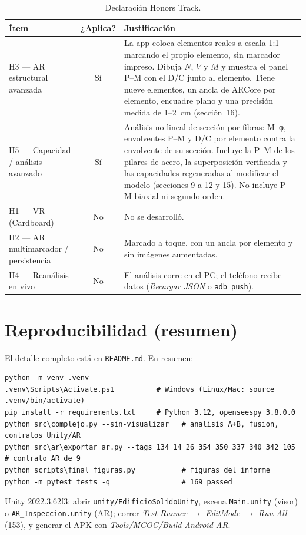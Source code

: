 \documentclass[11pt,a4paper]{article}
\begin{document}
\begin{table}[H]
\centering
\caption{Declaración Honors Track.}
\small
\begin{tabularx}{\textwidth}{lcX}
\toprule
Ítem & ¿Aplica? & Justificación \\
\midrule
H3 --- AR estructural avanzada & Sí &
La app coloca elementos reales a escala 1:1 marcando el propio elemento, sin
marcador impreso. Dibuja $N$, $V$ y $M$ y muestra el panel P--M con el D/C junto
al elemento. Tiene nueve elementos, un ancla de ARCore por elemento, encuadre
plano y una precisión medida de 1--2~cm (sección~16). \\
H5 --- Capacidad / análisis avanzado & Sí &
Análisis no lineal de sección por fibras: M--φ, envolventes P--M y D/C por
elemento contra la envolvente de su sección. Incluye la P--M de los pilares de
acero, la superposición verificada y las capacidades regeneradas al modificar
el modelo (secciones 9 a 12 y 15). No incluye P--M biaxial ni segundo orden. \\
H1 --- VR (Cardboard) & No & No se desarrolló. \\
H2 --- AR multimarcador / persistencia & No & Marcado a toque, con un ancla por elemento y sin imágenes aumentadas. \\
H4 --- Reanálisis en vivo & No & El análisis corre en el PC; el teléfono recibe datos (\emph{Recargar JSON} o \texttt{adb push}). \\
\bottomrule
\end{tabularx}
\end{table}

\appendix
\section{Reproducibilidad (resumen)}

El detalle completo está en \texttt{README.md}. En resumen:

\begin{lstlisting}
python -m venv .venv
.venv\Scripts\Activate.ps1          # Windows (Linux/Mac: source .venv/bin/activate)
pip install -r requirements.txt     # Python 3.12, openseespy 3.8.0.0
python src\complejo.py --sin-visualizar   # analisis A+B, fusion, contratos Unity/AR
python src\ar\exportar_ar.py --tags 134 14 26 354 350 337 340 342 105   # contrato AR de 9
python scripts\final_figuras.py           # figuras del informe
python -m pytest tests -q                 # 169 passed
\end{lstlisting}

Unity 2022.3.62f3: abrir \texttt{unity/EdificioSolidoUnity}, escena
\texttt{Main.unity} (visor) o \texttt{AR\_Inspeccion.unity} (AR); correr
\emph{Test Runner $\to$ EditMode $\to$ Run All} (153), y generar el APK con
\emph{Tools/MCOC/Build Android AR}.
\end{document}

